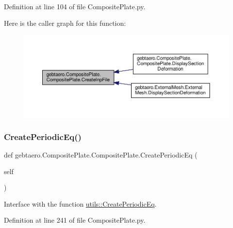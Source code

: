Definition at line 104 of file Composite\+Plate.\+py.

Here is the caller graph for this function\+:\nopagebreak
\begin{figure}[H]
\begin{center}
\leavevmode
\includegraphics[width=350pt]{classgebtaero_1_1_composite_plate_1_1_composite_plate_ab2aef5a02f71d8f508d4a8f1684295fd_icgraph}
\end{center}
\end{figure}
\mbox{\label{classgebtaero_1_1_composite_plate_1_1_composite_plate_a682fc7d2f0aca5dafbb381c95f437962}} 
\subsubsection{\texorpdfstring{Create\+Periodic\+Eq()}{CreatePeriodicEq()}}
{\footnotesize\ttfamily def gebtaero.\+Composite\+Plate.\+Composite\+Plate.\+Create\+Periodic\+Eq (\begin{DoxyParamCaption}\item[{}]{self }\end{DoxyParamCaption})}



Interface with the function \hyperlink{namespacegebtaero_1_1utils_a4f786ecbe66af9f64c802adf4e0a990f}{utils\+::\+Create\+Periodic\+Eq}. 



Definition at line 241 of file Composite\+Plate.\+py.

